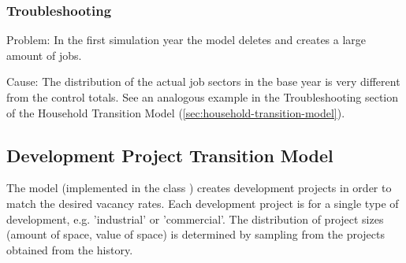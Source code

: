 \subsubsection{Troubleshooting}
%
\begin{description}
\item{Problem:} In the first simulation year the model deletes and creates a large amount of jobs.
\item{Cause:} The distribution of the actual job sectors in the base year is very different 
from the control totals. See an analogous example in the Troubleshooting section of the Household Transition 
Model (\ref{sec:household-transition-model}).
\end{description}

%
\subsection{Development Project Transition Model}
%
\label{sec:development-project-transition-model}
 
%
The model (implemented in the class ) 
creates development projects in order to match the desired vacancy rates. Each
development project is for a single type of development, e.g.  'industrial' or
'commercial'.  The distribution of project sizes (amount of space, value of
space) is determined by sampling from the projects obtained from the history.


